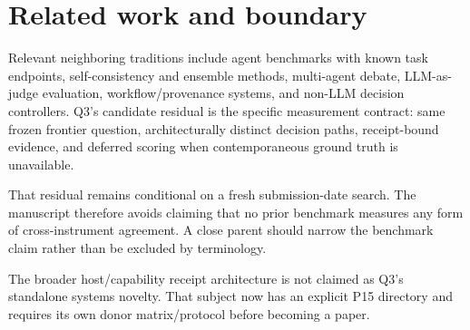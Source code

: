 \section{Related work and boundary}

Relevant neighboring traditions include agent benchmarks with known task endpoints, self-consistency and ensemble methods, multi-agent debate, LLM-as-judge evaluation, workflow/provenance systems, and non-LLM decision controllers. Q3's candidate residual is the specific measurement contract: same frozen frontier question, architecturally distinct decision paths, receipt-bound evidence, and deferred scoring when contemporaneous ground truth is unavailable.

That residual remains conditional on a fresh submission-date search. The manuscript therefore avoids claiming that no prior benchmark measures any form of cross-instrument agreement. A close parent should narrow the benchmark claim rather than be excluded by terminology.

The broader host/capability receipt architecture is not claimed as Q3's standalone systems novelty. That subject now has an explicit P15 directory and requires its own donor matrix/protocol before becoming a paper.